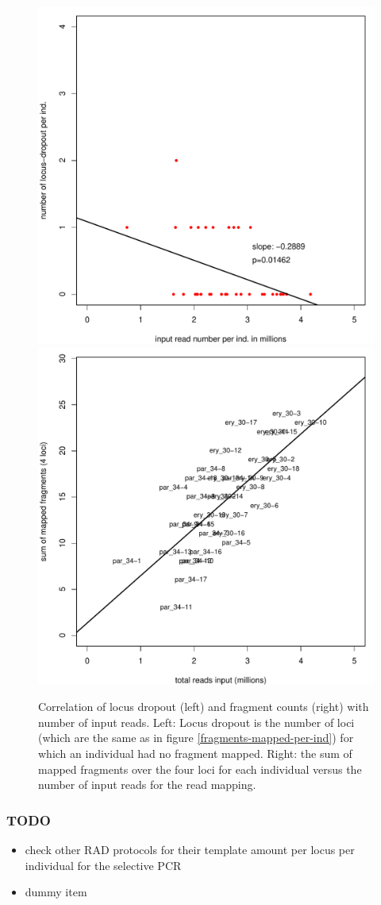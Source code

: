 \documentclass{article}\usepackage[]{graphicx}\usepackage[]{color}
\newenvironment{knitrout}{}{} %
\begin{document}
\begin{figure}
\begin{knitrout}
\color{fgcolor}

{\centering \includegraphics[width=.49\linewidth]{figure/frag_input_corr_fig-1} 
\includegraphics[width=.49\linewidth]{figure/frag_input_corr_fig-2} 

}



\end{knitrout}
\caption{Correlation of locus dropout (left) and fragment counts (right) with number of input reads. Left: Locus dropout is the number of loci (which are the same as in figure \ref{fragments-mapped-per-ind}) for which an individual had no fragment mapped. Right: the sum of mapped fragments over the four loci for each individual versus the number of input reads for the read mapping.}
\label{frag_input_corr_fig}
\end{figure}


\subsubsection{TODO}

\begin{itemize}
\item check other RAD protocols for their template amount per locus per individual for the selective PCR
\item dummy item
\end{itemize}
\end{document}

